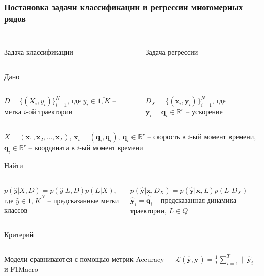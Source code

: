 \documentclass{beamer}
\begin{document}
\begin{frame}
\frametitle{Постановка задачи классификации и регрессии многомерных рядов}
\begin{columns}[T] %
\begin{column}{.48\textwidth}
\color{red}\rule{\linewidth}{4pt}

Задача классификации
\end{column}%
\hfill%
\begin{column}{.48\textwidth}
\color{blue}\rule{\linewidth}{4pt}

Задача регрессии
\end{column}%
\end{columns}
\begin{block}{Дано}
\begin{columns}[T] %
\begin{column}{.48\textwidth}
$D = \{(X_i, y_i)\}_{i=1}^N$, где $y_i \in \overline{1, K}$ -- метка $i$-ой траектории
\end{column}%
\hfill%
\begin{column}{.48\textwidth}
$D_X = \{(\mathbf{x}_i, \mathbf{y}_i)\}_{i=1}^N$, где $\mathbf{y}_i = \ddot{\mathbf{q}}_i \in \mathbb{R}^r$ -- ускорение
\end{column}%
\end{columns}
\hfill

$X = (\mathbf{x}_1, \mathbf{x}_2,..., \mathbf{x}_T)$, 
$\mathbf{x}_i = (\mathbf{q}_i, \mathbf{\dot{q}}_i),\ \mathbf{\dot{q}}_i \in \mathbb{R}^r$ -- скорость в $i$-ый момент времени, $\mathbf{q}_i \in \mathbb{R}^r$ -- координата в $i$-ый момент времени
\end{block}
\begin{block}{Найти}
\begin{columns}[T] %
\begin{column}{.48\textwidth}
$p(\hat{y}|X, D) = p(\hat{y}|L, D)p(L|X)$, где $\hat{y} \in \overline{1, K}^N$ -- предсказанные метки классов
\end{column}%
\hfill%
\begin{column}{.48\textwidth}
$p(\hat{\mathbf{y}}| \mathbf{x} , D_X)  = p(\hat{\mathbf{y}}| \mathbf{x}, L) p(L|D_X)$
$\hat{\mathbf{y}}_i = \hat{\ddot{\mathbf{q}}}_i$ -- предсказанная динамика траектории, $L \in Q$
\end{column}%
\end{columns}
\end{block}
\begin{block}{Критерий}
\begin{columns}[T] %
\begin{column}{.48\textwidth}
Модели сравниваются с помощью метрик Accuracy и F1Macro 
\end{column}%
\hfill%
\begin{column}{.48\textwidth}

$\mathcal{L}(\hat{\mathbf{y}}, \mathbf{y})  = \frac{1}{T}\sum_{i=1}^{T} \| \mathbf{\hat{y}}_i - \mathbf{y}_i \|_2^2$
\end{column}%
\end{columns}
\end{block}
\end{frame}
\end{document}
